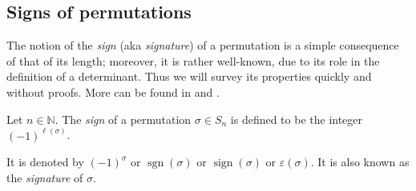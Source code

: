 \subsection{\label{sec.perm.sign}Signs of permutations}

The notion of the \emph{sign} (aka \emph{signature}) of a permutation is a
simple consequence of that of its length; moreover, it is rather well-known,
due to its role in the definition of a determinant. Thus we will survey its
properties quickly and without proofs. More can be found in \cite[\S 5.3 and
\S 5.6]{detnotes} and \cite[Appendix B]{Strick13}.

\begin{definition}
\label{def.perm.sign}Let $n\in\mathbb{N}$. The \emph{sign} of a permutation
$\sigma\in S_{n}$ is defined to be the integer $\left(  -1\right)
^{\ell\left(  \sigma\right)  }$.

It is denoted by $\left(  -1\right)  ^{\sigma}$ or $\operatorname*{sgn}\left(
\sigma\right)  $ or $\operatorname*{sign}\left(  \sigma\right)  $ or
$\varepsilon\left(  \sigma\right)  $. It is also known as the \emph{signature}
of $\sigma$.
\end{definition}

